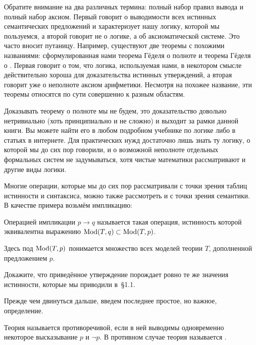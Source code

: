 Обратите внимание на два различных термина: полный набор правил вывода и полный набор аксиом. Первый говорит о выводимости всех истинных семантических предложений  и характеризует нашу логику, которой мы пользуемся, а второй говорит не о логике, а об аксиоматической системе. Это часто вносит путаницу. Например, существуют две теоремы с похожими названиями: сформулированная нами теорема Гёделя о полноте и теорема Гёделя о . Первая говорит о том, что логика, используемая нами, в некотором смысле действительно хороша для доказательства истинных утверждений, а вторая говорит уже о неполноте аксиом арифметики. Несмотря на похожее название, эти теоремы относятся по сути совершенно к разным областям.

Доказывать теорему о полноте мы не будем, это доказательство довольно нетривиально (хоть принципиально и не сложно) и выходит за рамки данной книги. Вы можете найти его в любом подробном учебнике по логике либо в статьях в интернете. Для практических нужд достаточно лишь знать ту логику, о которой мы до сих пор говорили, и о возможной неполноте отдельных формальных систем не задумываться, хотя чистые математики рассматривают и другие виды логики.

Многие операции, которые мы до сих пор рассматривали с точки зрения таблиц истинности и синтаксиса, можно также рассмотреть и с точки зрения семантики.  В качестве примера возьмём импликацию:

\begin{definition}
Операцией импликации $p\to q$ называется такая операция, истинность которой эквивалентна выражению $\operatorname{Mod}(T, q)\subset\operatorname{Mod}(T, p)$.
\end{definition}

Здесь под $\operatorname{Mod}(T, p)$ понимается множество всех моделей теории $T$, дополненной предложением $p$.

\begin{exercise}
Докажите, что приведённое утверждение порождает ровно те же значения истинности, которые мы приводили в~\S1.1.
\end{exercise}

Прежде чем двинуться дальше, введем последнее простое, но важное, определение.

\begin{definition}
Теория называется противоречивой, если в ней выводимы одновременно некоторое высказывание $p$ и $\neg p$. В противном случае теория называется .
\end{definition}

